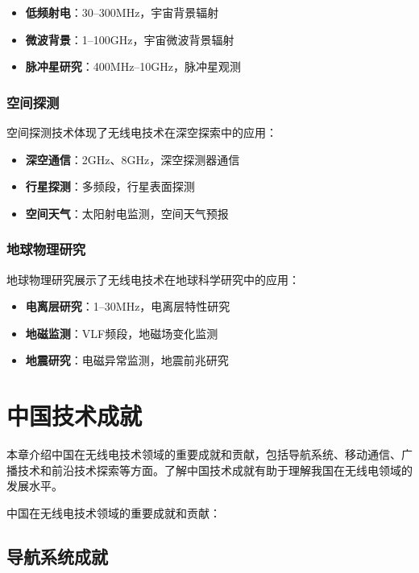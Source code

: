 \documentclass[12pt,UTF8]{ctexbook}
\begin{document}
\begin{itemize}[leftmargin=3.5em]
    \item \textbf{低频射电}：30--300MHz，宇宙背景辐射
    \item \textbf{微波背景}：1--100GHz，宇宙微波背景辐射
    \item \textbf{脉冲星研究}：400MHz--10GHz，脉冲星观测
\end{itemize}

\subsection{空间探测}

空间探测技术体现了无线电技术在深空探索中的应用：

\begin{itemize}[leftmargin=3.5em]
    \item \textbf{深空通信}：2GHz、8GHz，深空探测器通信
    \item \textbf{行星探测}：多频段，行星表面探测
    \item \textbf{空间天气}：太阳射电监测，空间天气预报
\end{itemize}

\subsection{地球物理研究}

地球物理研究展示了无线电技术在地球科学研究中的应用：

\begin{itemize}[leftmargin=3.5em]
    \item \textbf{电离层研究}：1--30MHz，电离层特性研究
    \item \textbf{地磁监测}：VLF频段，地磁场变化监测
    \item \textbf{地震研究}：电磁异常监测，地震前兆研究
\end{itemize}

\chapter{中国技术成就}

本章介绍中国在无线电技术领域的重要成就和贡献，包括导航系统、移动通信、广播技术和前沿技术探索等方面。了解中国技术成就有助于理解我国在无线电领域的发展水平。

中国在无线电技术领域的重要成就和贡献：

\section{导航系统成就}
\end{document}
